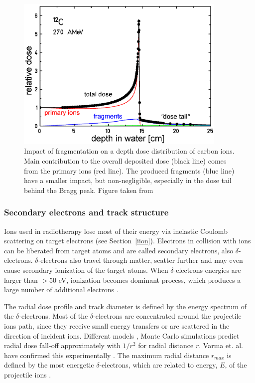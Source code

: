 \documentclass[type=dr, dr=rernat, accentcolor=tud7b,colorbacktitle, bigchapter, openright, twoside, 12pt ]{tudthesis}
\begin{document}
\begin{figure}[H]
\begin{center}
\includegraphics[width=0.9\textwidth]{./Images/iondepthdosesum.png}
\caption{Impact of fragmentation on a depth dose distribution of carbon ions. Main contribution to the overall deposited dose (black line) comes from the primary ions (red line). The produced fragments 
(blue line) have a smaller impact, but non-negligible, especially in the dose tail behind the Bragg peak. Figure taken from \cite{Groezinger2004}}
\label{iondd}
\end{center}
\end{figure}

\subsubsection{Secondary electrons and track structure}

Ions used in radiotherapy lose most of their energy via inelastic Coulomb scattering on target electrons (see Section~\ref{iion}). Electrons in collision with ions can be liberated from target atoms and are called secondary electrons, also $\delta$-electrons. $\delta$-electrons also travel through matter, scatter further and may even cause secondary ionization of the target atoms. When $\delta$-electrons energies are larger than $>$50 eV,
ionization becomes dominant process, which produces a large number of additional electrons \cite{Kraft2000,Schardt2010}.

The radial dose profile and track diameter is defined by the energy spectrum of the $\delta$-electrons. Most of the $\delta$-electrons are concentrated around the projectile ions path, since they receive small energy transfers 
or are scattered in the direction of incident ions. Different models \cite{!!}, Monte Carlo simulations \cite{!!} predict radial dose fall-off approximately with $1/r^2$ for radial distance $r$. Varma et. al. have confirmed 
this experimentally \cite{Varma1977}. The maximum radial distance $r_{max}$ is defined by the most energetic $\delta$-electrons, which are related to energy, $E$, of the projectile ions \cite{Kiefer1986}.
\end{document}
